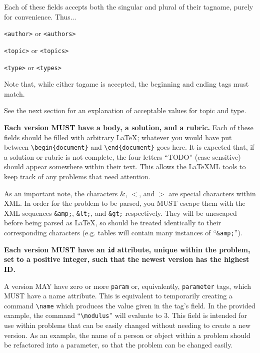     Each of these fields accepts both the singular and plural of their tagname, purely for convenience. Thus...
    \begin{description}\itemsep0pt
      \item[Authors] \texttt{<author>} or \texttt{<authors>}
      \item[Topic] \texttt{<topic>} or \texttt{<topics>}
      \item[Type] \texttt{<type>} or \texttt{<types>}
    \end{description}
    
    Note that, while either tagame is accepted, the beginning and ending tags must match.
    
    See the next section for an explanation of acceptable values for topic and type.
    
    \textbf{Each version MUST have a body, a solution, and a rubric.} Each of these fields should be filled with arbitrary \LaTeX; whatever you would have put between \texttt{\textbackslash begin\{document\}} and \texttt{\textbackslash end\{document\}} goes here. It is expected that, if a solution or rubric is not complete, the four letters ``TODO'' (case sensitive) should appear somewhere within their text. This allows the \LaTeX ML tools to keep track of any problems that need attention.
    
    As an important note, the characters \&, $<$, and $>$ are special characters within XML. In order for the problem to be parsed, you MUST escape them with the XML sequences \texttt{\&amp;}, \texttt{\&lt;}, and \texttt{\&gt;} respectively. They will be unescaped before being parsed as \LaTeX, so should be treated identically to their corresponding characters (e.g. tables will contain many instances of ``\texttt{\&amp;}'').
    
    \textbf{Each version MUST have an \texttt{id} attribute, unique within the problem, set to a positive integer, such that the newest version has the highest ID.}
    
    A version MAY have zero or more \texttt{param} or, equivalently, \texttt{parameter} tags, which MUST have a name attribute. This is equivalent to temporarily creating a command \texttt{\textbackslash name} which produces the value given in the tag's field. In the provided example, the command ``\texttt{\textbackslash modulus}'' will evaluate to 3. This field is intended for use within problems that can be easily changed without needing to create a new version. As an example, the name of a person or object within a problem should be refactored into a parameter, so that the problem can be changed easily.
    
